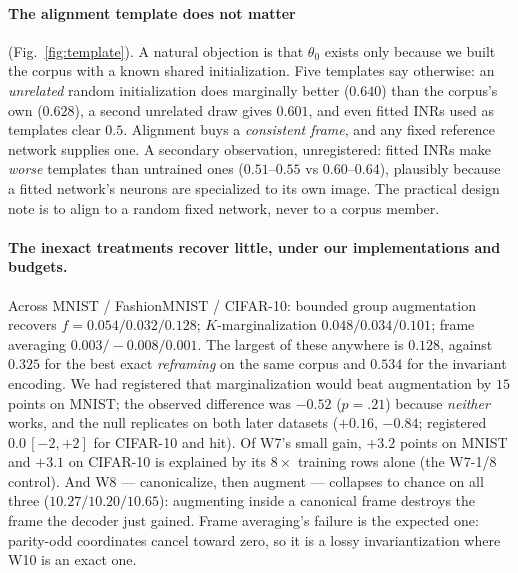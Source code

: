 \documentclass[10pt,letterpaper]{article}
\theoremstyle{definition}
\begin{document}
\paragraph{The alignment template does not matter} (Fig.~\ref{fig:template}). A natural objection
is that $\theta_0$ exists only because we built the corpus with a known shared initialization.
Five templates say otherwise: an \emph{unrelated} random initialization does marginally better
($0.640$) than the corpus's own ($0.628$), a second unrelated draw gives $0.601$, and even fitted
INRs used as templates clear $0.5$. Alignment buys a \emph{consistent frame}, and any fixed
reference network supplies one. A secondary observation, unregistered: fitted INRs make
\emph{worse} templates than untrained ones ($0.51$--$0.55$ vs $0.60$--$0.64$), plausibly because
a fitted network's neurons are specialized to its own image. The practical design note is to
align to a random fixed network, never to a corpus member.



\paragraph{The inexact treatments recover little, under our implementations and budgets.} Across
MNIST / FashionMNIST / CIFAR-10: bounded group augmentation recovers $f = 0.054 / 0.032 / 0.128$;
$K$-marginalization $0.048 / 0.034 / 0.101$; frame averaging $0.003 / -0.008 / 0.001$. The largest
of these anywhere is $0.128$, against $0.325$ for the best exact \emph{reframing} on the same
corpus and $0.534$ for the invariant encoding. We had
registered that marginalization would beat augmentation by $15$ points on MNIST; the observed
difference was $-0.52$ ($p = .21$) because \emph{neither} works, and the null replicates on both
later datasets ($+0.16$, $-0.84$; registered $0.0\,[-2,+2]$ for CIFAR-10 and hit). Of W7's small
gain, $+3.2$ points on MNIST and $+3.1$ on CIFAR-10 is explained by its $8\times$ training rows
alone (the W7-1/8 control). And W8 --- canonicalize, then augment --- collapses to chance on all
three ($10.27 / 10.20 / 10.65$): augmenting inside a canonical frame destroys the frame the
decoder just gained. Frame averaging's failure is the expected one: parity-odd coordinates cancel
toward zero, so it is a lossy invariantization where W10 is an exact one.
\end{document}

